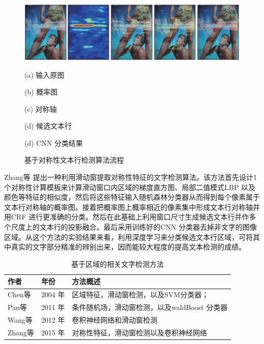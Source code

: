     \begin{figure}[!h]
    \centering
    \includegraphics[width=\textwidth]{./figures/c2_zhang_cnn.jpg}
    \begin{minipage}[t]{0.18\linewidth}
    \centerline{ \small (a) 输入原图}
    \end{minipage}
    \begin{minipage}[t]{0.18\linewidth}
    \centerline{ \small (b) 概率图}
    \end{minipage}
    \begin{minipage}[t]{0.18\linewidth}
    \centerline{ \small (c) 对称轴}
    \end{minipage}
    \begin{minipage}[t]{0.18\linewidth}
    \centerline{ \small (d) 候选文本行}
    \end{minipage}
    \begin{minipage}[t]{0.18\linewidth}
    \centerline{ \small (d) CNN 分类结果}
    \end{minipage}
    \caption{基于对称性文本行检测算法流程}
    \label{fig.c2_zhang_cnn}
    \end{figure}

    Zhang等\cite{Zhang2015Symmetry} 提出一种利用滑动窗提取对称性特征的文字检测算法。该方法首先设计1 个对称性计算模板来计算滑动窗口内区域的梯度直方图、局部二值模式LBP 以及颜色等特征的相似度，然后将这些特征输入随机森林分类器从而得到每个像素属于文本行对称轴的概率图。接着把概率图上概率相近的像素集中形成文本行对称轴并用CRF 进行更准确的分类。然后在此基础上利用窗口尺寸生成候选文本行并作多个尺度上的文本行的投影融合。最后采用训练好的CNN 分类器去掉非文字的图像区域。从这个方法的实验结果来看，利用深度学习来分类候选文本行区域，可将其中真实的文字部分精准的辨别出来，因而能较大程度的提高文本检测的成绩。

    \begin{table}[!h]
    \centering
    \caption{基于区域的相关文字检测方法}
    \begin{tabular}{p{} p{} p{}}
    \toprule
    作者 & 年份 & 方法概述 \\
    \midrule
    Chen等\cite{Chen2004Detecting} & 2004 年 & 区域特征，滑动窗检测，以及SVM分类器；\\
    Pan等\cite{Pan2011A} & 2011 年 &   条件随机场，滑动窗检测，以及waldBoost 分类器\\
    Wang等\cite{Wang2012End} & 2012 年 & 卷积神经网络和滑动窗检测 \\
    Zhang等\cite{Zhang2015Symmetry} & 2015 年 & 对称性特征，滑动窗检测以及卷积神经网络 \\
    \bottomrule
    \end{tabular}
    \label{tab.c2_region_based}
    \end{table}

